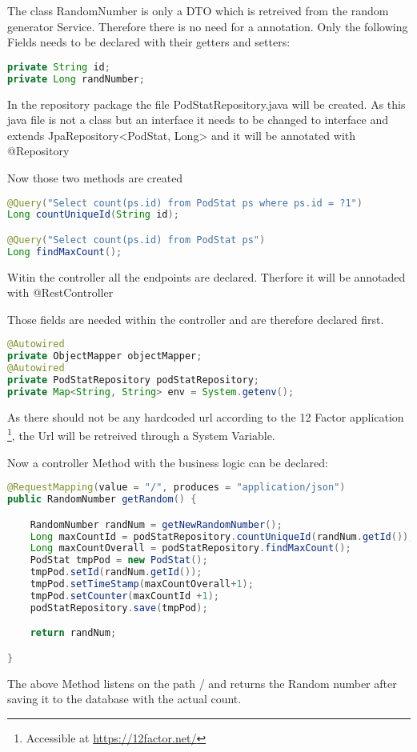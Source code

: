 The class RandomNumber is only a DTO which is retreived from the random generator Service. Therefore there is no need for a annotation.
Only the following Fields needs to be declared with their getters and setters:

\begin{lstlisting}[language=Java]
private String id;
private Long randNumber;
\end{lstlisting}

In the repository package the file PodStatRepository.java will be created.
As this java file is not a class but an interface it needs to be changed to interface and extends JpaRepository<PodStat, Long>
and it will be annotated with @Repository

Now those two methods are created 
\begin{lstlisting}[language=Java]
@Query("Select count(ps.id) from PodStat ps where ps.id = ?1")
Long countUniqueId(String id);

@Query("Select count(ps.id) from PodStat ps")
Long findMaxCount();
\end{lstlisting}

Witin the controller all the endpoints are declared. Therfore it will be annotaded with @RestController

Those fields are needed within the controller and are therefore declared first.
\begin{lstlisting}[language=Java]
@Autowired
private ObjectMapper objectMapper;
@Autowired
private PodStatRepository podStatRepository;
private Map<String, String> env = System.getenv();
\end{lstlisting}
As there should not be any hardcoded url according to the 12 Factor application \footnote{Accessible at \url{https://12factor.net/}}, the Url will be retreived through a System Variable.

Now a controller Method with the business logic can be declared:
\begin{lstlisting}[language=Java]
@RequestMapping(value = "/", produces = "application/json")
public RandomNumber getRandom() {

    RandomNumber randNum = getNewRandomNumber();
    Long maxCountId = podStatRepository.countUniqueId(randNum.getId());
    Long maxCountOverall = podStatRepository.findMaxCount();
    PodStat tmpPod = new PodStat();
    tmpPod.setId(randNum.getId());
    tmpPod.setTimeStamp(maxCountOverall+1);
    tmpPod.setCounter(maxCountId +1);
    podStatRepository.save(tmpPod);

    return randNum;

}
\end{lstlisting}
The above Method listens on the path / and returns the Random number after saving it to the database with the actual count.

